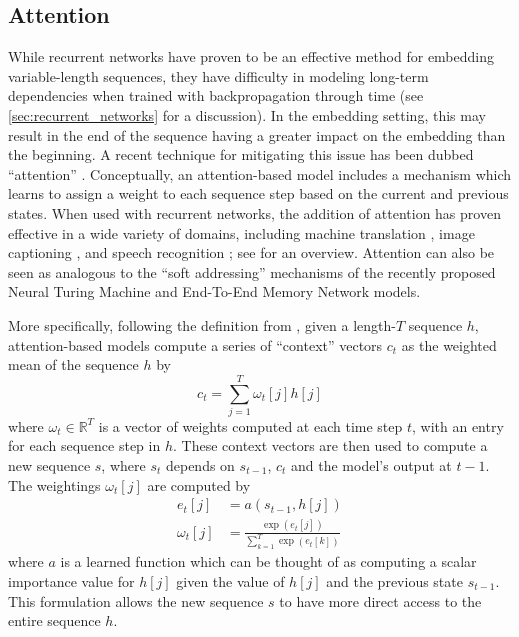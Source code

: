 \subsection{Attention}

While recurrent networks have proven to be an effective method for embedding variable-length sequences, they have difficulty in modeling long-term dependencies when trained with backpropagation through time \cite{bengio1994learning,hochreiter1997long,pascanu2013difficulty} (see \cref{sec:recurrent_networks} for a discussion).
In the embedding setting, this may result in the end of the sequence having a greater impact on the embedding than the beginning.
A recent technique for mitigating this issue has been dubbed ``attention'' \cite{bahdanau2014neural}.
Conceptually, an attention-based model includes a mechanism which learns to assign a weight to each sequence step based on the current and previous states.
When used with recurrent networks, the addition of attention has proven effective in a wide variety of domains, including machine translation \citep{bahdanau2014neural}, image captioning \citep{xu2015show}, and speech recognition \cite{chan2015listen,bahdanau2015end}; see \cite{cho2015describing} for an overview.
Attention can also be seen as analogous to the ``soft addressing'' mechanisms of the recently proposed Neural Turing Machine \cite{graves2014neural} and End-To-End Memory Network \cite{sukhbaatar2015end} models.

More specifically, following the definition from \cite{bahdanau2014neural}, given a length-$T$ sequence $h$, attention-based models compute a series of ``context'' vectors $c_t$ as the weighted mean of the sequence $h$ by
\begin{equation}
c_t = \sum_{j = 1}^T \omega_t[j] h[j]
\end{equation}
where $\omega_t \in \mathbb{R}^T$ is a vector of weights computed at each time step $t$, with an entry for each sequence step in $h$.
These context vectors are then used to compute a new sequence $s$, where $s_t$ depends on $s_{t - 1}$, $c_t$ and the model's output at $t - 1$.
The weightings $\omega_t[j]$ are computed by
\begin{align}
e_t[j] &= a(s_{t - 1}, h[j])\\
\omega_t[j] &= \frac{\exp(e_t[j])}{\sum_{k = 1}^T \exp(e_t[k])}
\end{align}
where $a$ is a learned function which can be thought of as computing a scalar importance value for $h[j]$ given the value of $h[j]$ and the previous state $s_{t - 1}$.
This formulation allows the new sequence $s$ to have more direct access to the entire sequence $h$.

